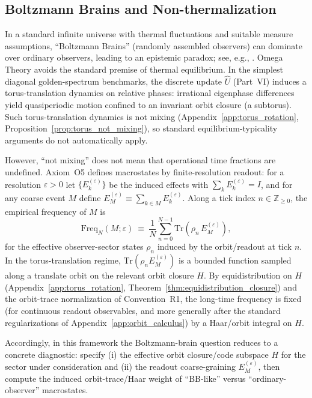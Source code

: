 \subsection{Boltzmann Brains and Non-thermalization}
In a standard infinite universe with thermal fluctuations and suitable measure assumptions, ``Boltzmann Brains'' (randomly assembled observers) can dominate over ordinary observers, leading to an epistemic paradox; see, e.g., \cite{DysonKlebanSusskind2002,BoussoFreivogelYang2007,BoussoFreivogelYang2008}.
Omega Theory avoids the standard premise of thermal equilibrium. In the simplest diagonal golden-spectrum benchmarks, the discrete update $\hat{U}$ (Part~VI) induces a torus-translation dynamics on relative phases: irrational eigenphase differences yield quasiperiodic motion confined to an invariant orbit closure (a subtorus). Such torus-translation dynamics is not mixing (Appendix~\ref{app:torus_rotation}, Proposition~\ref{prop:torus_not_mixing}), so standard equilibrium-typicality arguments do not automatically apply.
\par
\noindent
However, ``not mixing'' does not mean that operational time fractions are undefined. Axiom~O5 defines macrostates by finite-resolution readout: for a resolution $\varepsilon>0$ let $\{E_k^{(\varepsilon)}\}$ be the induced effects with $\sum_k E_k^{(\varepsilon)}=I$, and for any coarse event $M$ define $E_M^{(\varepsilon)}\equiv \sum_{k\in M}E_k^{(\varepsilon)}$. Along a tick index $n\in\mathbb{Z}_{\ge 0}$, the empirical frequency of $M$ is
\begin{equation}
    \mathrm{Freq}_N(M;\varepsilon)\ \equiv\ \frac{1}{N}\sum_{n=0}^{N-1}\mathrm{Tr}\!\left(\rho_n\,E_M^{(\varepsilon)}\right),
\end{equation}
for the effective observer-sector states $\rho_n$ induced by the orbit/readout at tick $n$. In the torus-translation regime, $\mathrm{Tr}(\rho_n E_M^{(\varepsilon)})$ is a bounded function sampled along a translate orbit on the relevant orbit closure $H$. By equidistribution on $H$ (Appendix~\ref{app:torus_rotation}, Theorem~\ref{thm:equidistribution_closure}) and the orbit-trace normalization of Convention~R1, the long-time frequency is fixed (for continuous readout observables, and more generally after the standard regularizations of Appendix~\ref{app:orbit_calculus}) by a Haar/orbit integral on $H$.
\par
\noindent
Accordingly, in this framework the Boltzmann-brain question reduces to a concrete diagnostic: specify (i) the effective orbit closure/code subspace $H$ for the sector under consideration and (ii) the readout coarse-graining $E_M^{(\varepsilon)}$, then compute the induced orbit-trace/Haar weight of ``BB-like'' versus ``ordinary-observer'' macrostates.
